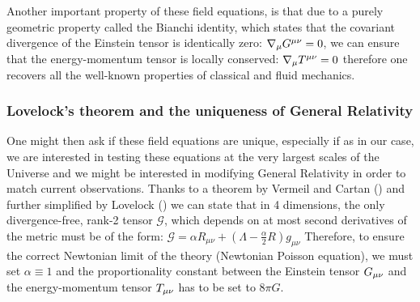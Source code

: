 Another important property of these field equations, is that due to a purely geometric property called the Bianchi identity, which
states that the covariant divergence of the Einstein tensor is identically zero:
$\nabla_{\mu} G^{\mu \nu} = 0$, 
we can ensure that the energy-momentum tensor is locally conserved:
\beeqc$
\nabla_{\mu} T^{\mu \nu} = 0
$
therefore one recovers all the well-known properties of classical and fluid mechanics.


\subsubsection{Lovelock's theorem and the uniqueness of General Relativity}

One might then ask if these field equations are unique, especially if as in our case, 
we are interested in testing these equations at the very largest scales of the Universe and we might 
be interested in modifying General Relativity in order to match current observations.
Thanks to a theorem by Vermeil and Cartan (\cite{cite Vermeil, Cartan, 1921}) 
and further simplified by Lovelock (\cite{1970, Lovelock}) we can state that in 4 dimensions,
the only divergence-free, rank-2 tensor $\mathcal{G}$, which depends on at most second derivatives
of the metric must be of the form:
\beeqp$
\mathcal{G} =  \alpha R_{\mu \nu} + \left( \Lambda - \frac{\alpha}{2} R \right) g_{\mu \nu}
$
Therefore, to ensure the correct Newtonian limit of the theory (Newtonian Poisson equation), we must set $\alpha \equiv 1$
and the proportionality constant between the Einstein tensor $G_{\mu \nu}$  and the energy-momentum tensor
$T_{\mu \nu}$ has to be set to $8 \pi G$.

